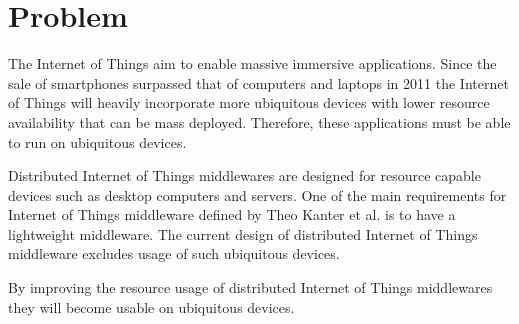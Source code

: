 \section{Problem}
The Internet of Things aim to enable massive immersive applications. Since the sale of smartphones surpassed that of computers and laptops in 2011 \cite{canalsys} the Internet of Things will heavily incorporate more ubiquitous devices with lower resource availability that can be mass deployed. Therefore, these applications must be able to run on ubiquitous devices.

Distributed Internet of Things middlewares are designed for resource capable devices such as desktop computers and servers. One of the main requirements for Internet of Things middleware defined by Theo Kanter et al. \cite{Kanter539187} is to have a lightweight middleware. The current design of distributed Internet of Things middleware excludes usage of such ubiquitous devices.

By improving the resource usage of distributed Internet of Things middlewares they will become usable on ubiquitous devices. 